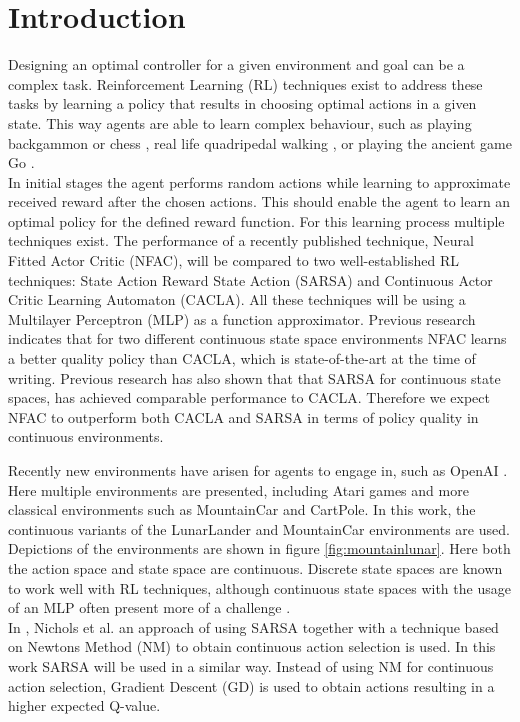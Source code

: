 
\section{Introduction}

Designing an optimal controller for a given environment and goal can be a complex task. Reinforcement Learning (RL) techniques exist to address these tasks by learning a policy that results in choosing optimal actions in a given state. This way agents are able to learn complex behaviour, such as playing backgammon \cite{tesauro2002programming} or chess \cite{baxter1999knightcap},
real life quadripedal walking \cite{kohl2004policy}, or playing the ancient game Go \cite{alphago}. \\  

In initial stages the agent performs random actions while learning to approximate received reward after the chosen actions. This should enable the agent to learn an optimal policy for the defined reward function. For this learning process multiple techniques exist. The performance of a recently published technique, Neural Fitted Actor Critic (NFAC), will be compared to two well-established RL techniques: State Action Reward State Action (SARSA) and Continuous Actor Critic Learning Automaton (CACLA). All these techniques will be using a Multilayer Perceptron (MLP) as a function approximator. Previous research \cite{zimmer2016neural} indicates that for two different continuous state space environments NFAC learns a better quality policy than CACLA, which is state-of-the-art at the time of writing. Previous research \cite{nichols2015continuous} has also shown that that SARSA for continuous state spaces, has achieved comparable performance to CACLA. Therefore we expect NFAC to outperform both CACLA and SARSA in terms of policy quality in continuous environments.

Recently new environments have arisen for agents to engage in, such as OpenAI \cite{openaigym}. Here multiple environments are presented, including Atari games and more classical environments such as MountainCar and CartPole. In this work, the continuous variants of the LunarLander and MountainCar environments are used. Depictions of the environments are shown in figure \ref{fig:mountainlunar}. Here both the action space and state space are continuous.  Discrete state spaces are known to work well with RL techniques, although continuous state spaces with the usage of an MLP often present more of a challenge \cite{cetina2008multilayer}. \\
In \cite{nichols2015continuous}, Nichols et al. an approach of using SARSA together with a technique based on Newtons Method (NM) to obtain continuous action selection is used. In this work SARSA will be used in a similar way. Instead of using NM for continuous action selection, Gradient Descent (GD) is used to obtain actions resulting in a higher expected Q-value.

